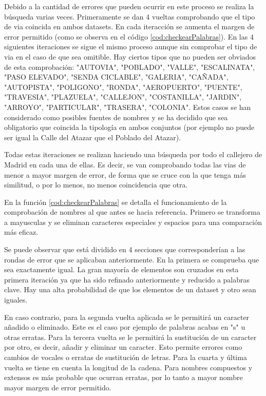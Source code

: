 Debido a la cantidad de errores que pueden ocurrir en este proceso se realiza la búsqueda varias veces. Primeramente se dan 4 vueltas comprobando que el tipo de via coincida en ambos datasets. En cada iteracción se aumenta el margen de error permitido (como se observa en el código \ref{cod:checkearPalabras}). En las 4 siguientes iteraciones se sigue el mismo proceso aunque sin comprobar el tipo de via en el caso de que sea omitible. Hay ciertos tipos que no pueden ser obviados de esta comprobación: "AUTOVIA", "POBLADO", "VALLE", "ESCALINATA", "PASO ELEVADO", "SENDA CICLABLE", "GALERIA", "CAÑADA", "AUTOPISTA", "POLIGONO", "RONDA", "AEROPUERTO", "PUENTE", "TRAVESIA", "PLAZUELA", "CALLEJON", "COSTANILLA", "JARDIN", "ARROYO", "PARTICULAR", "TRASERA", "COLONIA". Estos casos se han considerado como posibles fuentes de nombres y se ha decidido que sea obligatorio que coincida la tipología en ambos conjuntos (por ejemplo no puede ser igual la Calle del Atazar que el Poblado del Atazar).

Todas estas iteraciones se realizan haciendo una búsqueda por todo el callejero de Madrid en cada una de ellas. Es decir, se van comprobando todas las vias de menor a mayor margen de error, de forma que se cruce con la que tenga más similitud, o por lo menos, no menos coincidencia que otra.




En la función \ref{cod:checkearPalabras} se detalla el funcionamiento de la comprobación de nombres al que antes se hacia referencia.
Primero se transforma a mayusculas y se eliminan caracteres especiales y espacios para una comparación más eficaz.

Se puede observar que está dividido en 4 secciones que corresponderían a las rondas de error que se aplicaban anteriormente. 
En la primera se comprueba que sea exactamente igual. La gran mayoría de elementos son cruzados en esta primera iteración ya que ha sido refinado anteriormente y reducido a palabras clave. Hay una alta probabilidad de que los elementos de un dataset y otro sean iguales.

En caso contrario, para la segunda vuelta aplicada se le permitirá un caracter añadido o eliminado. Este es el caso por ejemplo de palabras acabas en "s" u otras erratas. Para la tercera vuelta se le permitirá la sustitución de un caracter por otro, es decir, añadir y eliminar un caracter. Esto permite errores como cambios de vocales o erratas de sustitución de letras. Para la cuarta y última vuelta se tiene en cuenta la longitud de la cadena. Para nombres compuestos y extensos es más probable que ocurran erratas, por lo tanto a mayor nombre mayor margen de error permitido.

